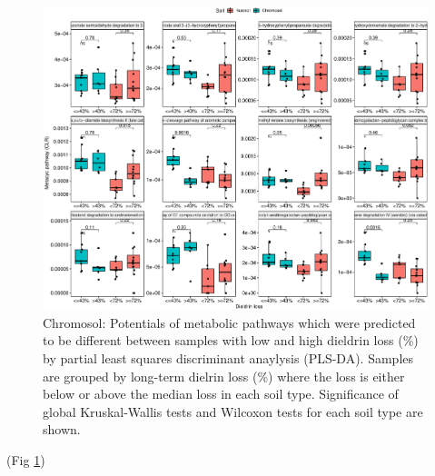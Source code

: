 \documentclass[
]{article}
\begin{document}
\begin{figure}
\centering
\includegraphics{M2_Results_files/figure-latex/plsdach-1.pdf}
\caption{\label{fig:plsdach}Chromosol: Potentials of metabolic pathways which were predicted to be different between samples with low and high dieldrin loss (\%) by partial least squares discriminant anaylysis (PLS-DA). Samples are grouped by long-term dielrin loss (\%) where the loss is either below or above the median loss in each soil type. Significance of global Kruskal-Wallis tests and Wilcoxon tests for each soil type are shown.}
\end{figure}

(Fig \ref{fig:plsdach})
\end{document}
